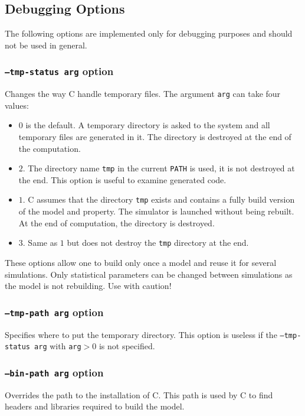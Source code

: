 \documentclass{article}
\newcommand{\cosmos}{\mbox{\textup{C}\scalebox{0.75}{{\textsc{OSMOS}}}}}
\begin{document}
\subsection{Debugging Options}
The following options are implemented only for debugging purposes and
should not be used in general.

\subsubsection{\texttt{--tmp-status arg} option}
Changes the way \cosmos{} handle temporary files. The argument \texttt{arg}
can take four values: 
\begin{itemize}
\item $0$ is the default. A temporary directory is asked to the system and
  all temporary files are generated in it. The directory is destroyed
  at the end of the computation.
\item $2$. The directory name \texttt{tmp} in the current
  \texttt{PATH} is used, it is not destroyed at the end. This option
  is useful to examine generated code.
\item $1$. \cosmos{} assumes that the directory \texttt{tmp} exists
  and contains a fully build version of the model and property. The
  simulator is launched without being rebuilt. At the end of computation,
  the directory is destroyed.
\item $3$. Same as $1$ but does not destroy the \texttt{tmp} directory
  at the end.
\end{itemize}
These options allow one to build only once a model and reuse it for
several simulations. Only statistical parameters can be changed between simulations
as the model is not rebuilding. Use with caution!

\subsubsection{\texttt{--tmp-path arg} option}
Specifies where to put the temporary directory. This option is useless
if the \texttt{--tmp-status arg} with \texttt{arg}$>0$ is not specified.

\subsubsection{\texttt{--bin-path arg} option}
Overrides the path to the installation of \cosmos{}. This path is used
by \cosmos{} to find headers and libraries required to build the model.
\end{document}
